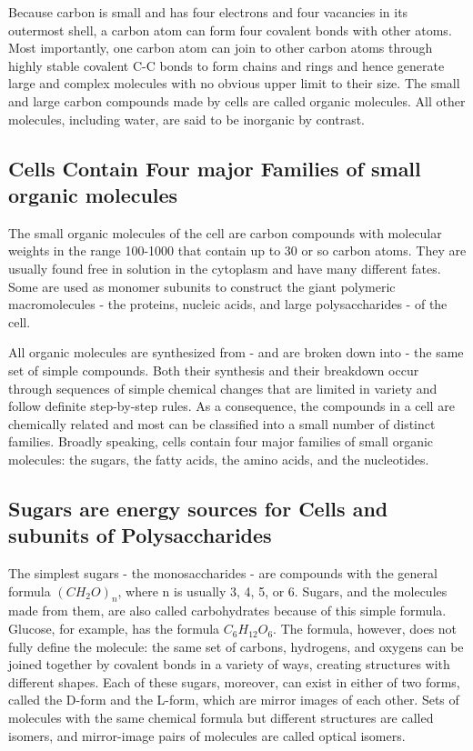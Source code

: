 Because carbon is small
and has four electrons and four vacancies in its outermost shell, a carbon
atom can form four covalent bonds with other atoms. Most importantly,
one carbon atom can join to other carbon atoms through highly stable
covalent C-C bonds to form chains and rings and hence generate large
and complex molecules with no obvious upper limit to their size.
The small and large carbon compounds made by
cells are called organic molecules. All other molecules, including water,
are said to be inorganic by contrast.

\subsection{Cells Contain Four major Families of small organic molecules}

The small organic molecules of the cell are carbon compounds with
molecular weights in the range 100-1000 that contain up to 30 or so carbon 
atoms. They are usually found free in solution in the cytoplasm and
have many different fates. Some are used as monomer subunits to construct 
the giant polymeric macromolecules - the proteins, nucleic acids,
and large polysaccharides - of the cell.

All organic molecules are synthesized from - and are broken down
into - the same set of simple compounds. Both their synthesis and their
breakdown occur through sequences of simple chemical changes that
are limited in variety and follow definite step-by-step rules. As a consequence, 
the compounds in a cell are chemically related and most can be
classified into a small number of distinct families. Broadly speaking, cells
contain four major families of small organic molecules: the sugars, the
fatty acids, the amino acids, and the nucleotides.

\subsection{Sugars are energy sources for Cells and subunits of Polysaccharides}

The simplest sugars - the monosaccharides - are compounds with the
general formula $(CH_{2}O)_{n}$, where n is usually 3, 4, 5, or 6. Sugars, and
the molecules made from them, are also called carbohydrates because
of this simple formula. Glucose, for example, has the formula $C_{6}H_{12}O_{6}$. 
The formula, however, does not fully define the molecule:
the same set of carbons, hydrogens, and oxygens can be joined together
by covalent bonds in a variety of ways, creating structures with different
shapes.
Each of these sugars, moreover, can exist in either of two forms, called
the D-form and the L-form, which are mirror images of each other. Sets
of molecules with the same chemical formula but different structures are
called isomers, and mirror-image pairs of molecules are called optical isomers.

